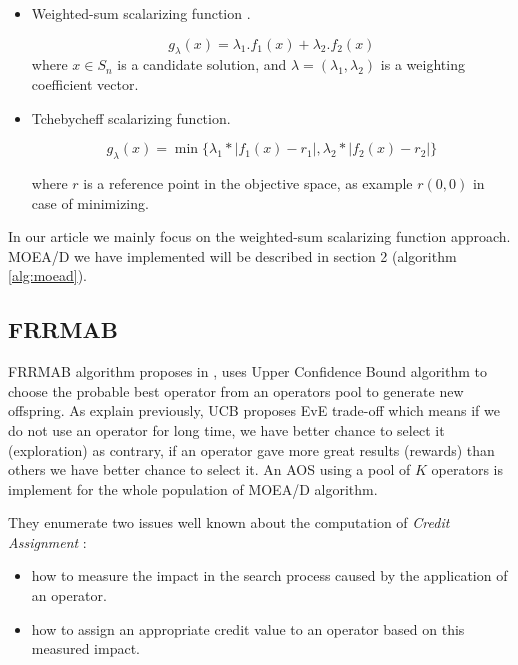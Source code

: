 \documentclass{article}
\begin{document}
    \begin{itemize}
        \item
        Weighted-sum scalarizing function \citep{DBLP:conf/emo/LiefoogheDVAT17}.

        $$g_\lambda(x) = \lambda_1.f_1(x) + \lambda_2.f_2(x)$$
        where $x \in S_n$ is a candidate solution, and $\lambda = (\lambda_1, \lambda_2)$ is a weighting coefficient vector.
        \item
        Tchebycheff scalarizing function.

        $$g_{\lambda} (x) = \min \bigg\{ \lambda_1 * |f_1(x) - r_1|, \lambda_2 * |f_2(x) - r_2| \bigg\} $$

        where $r$ is a reference point in the objective space, as example $r(0,0)$ in case of minimizing.
    \end{itemize}

    In our article we mainly focus on the weighted-sum scalarizing function approach. MOEA/D we have implemented will be described in section 2 (algorithm \ref{alg:moead}).

    \subsection{FRRMAB}

    FRRMAB algorithm proposes in \citep{DBLP:journals/tec/LiFKZ14}, uses Upper Confidence Bound algorithm to choose the probable best operator from an operators pool to generate new offspring. As explain previously, UCB proposes EvE trade-off which means if we do not use an operator for long time, we have better chance to select it (exploration) as contrary, if an operator gave more great results (rewards) than others we have better chance to select it. An AOS using a pool of $K$ operators is implement for the whole population of MOEA/D algorithm.

    \vspace{3mm}

    They enumerate two issues well known about the computation of \textit{Credit Assignment} :

    \begin{itemize}
        \item how to measure the impact in the search process caused
        by the application of an operator.
        \item how to assign an appropriate credit value to an operator
        based on this measured impact.
    \end{itemize}
\end{document}

